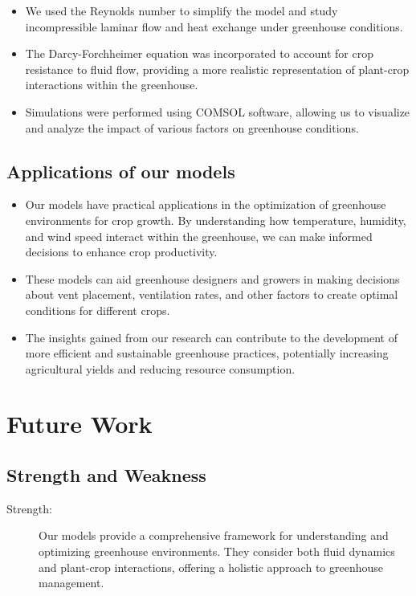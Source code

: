 \documentclass{apmcmthesis}
\begin{document}
{\begin{itemize}
\item We used the Reynolds number to simplify the model and study incompressible laminar flow and heat exchange under greenhouse conditions.

\item The Darcy-Forchheimer equation was incorporated to account for crop resistance to fluid flow, providing a more realistic representation of plant-crop interactions within the greenhouse.

\item Simulations were performed using COMSOL software, allowing us to visualize and analyze the impact of various factors on greenhouse conditions.
\end{itemize}

\subsection{Applications of our models}
\begin{itemize}
\item Our models have practical applications in the optimization of greenhouse environments for crop growth. By understanding how temperature, humidity, and wind speed interact within the greenhouse, we can make informed decisions to enhance crop productivity.

\item These models can aid greenhouse designers and growers in making decisions about vent placement, ventilation rates, and other factors to create optimal conditions for different crops.

\item The insights gained from our research can contribute to the development of more efficient and sustainable greenhouse practices, potentially increasing agricultural yields and reducing resource consumption.
\end{itemize}

\section{Future Work}
\subsection{Strength and Weakness}

\begin{description}
\item[Strength:] Our models provide a comprehensive framework for understanding and optimizing greenhouse environments. They consider both fluid dynamics and plant-crop interactions, offering a holistic approach to greenhouse management.


\end{description}}
\end{document}
